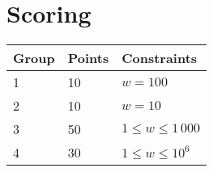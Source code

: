 \section*{Scoring}
\begin{tabular}{|l|l|l|}
\hline
Group & Points & Constraints \\ \hline
1     & 10     & $w = 100$ \\ \hline
2     & 10     & $w = 10$ \\ \hline
3     & 50     & $1 \leq w \leq 1\,000$ \\ \hline
4     & 30     & $1 \leq w \leq 10^6$ \\ \hline
\end{tabular}
